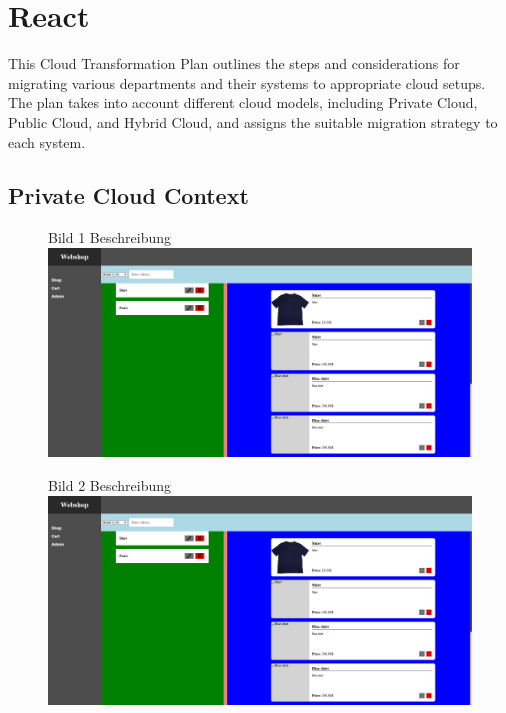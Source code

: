 \section{React}

This Cloud Transformation Plan outlines the steps and considerations for migrating various departments and their systems to appropriate cloud setups. The plan takes into account different cloud models, including Private Cloud, Public Cloud, and Hybrid Cloud, and assigns the suitable migration strategy to each system.

\subsection{Private Cloud Context}

\begin{figure}[H] %
    \centering
    \begin{subcaptionbox}{Bild 1 Beschreibung\label{fig:bild1}}{
        \includegraphics[width=0.45\linewidth]{Images/webshop_4.png}}
    \end{subcaptionbox}
    \begin{subcaptionbox}{Bild 2 Beschreibung\label{fig:bild2}}{
        \includegraphics[width=0.45\linewidth]{Images/webshop_4.png}}
    \end{subcaptionbox}

    \vspace{0.5cm} %


\end{figure}
